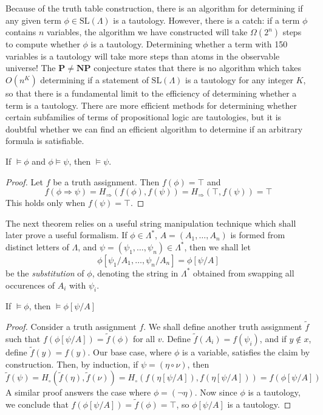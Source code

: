 Because of the truth table construction, there is an algorithm for determining if any given term $\phi \in \text{SL}(\Lambda)$ is a tautology. However, there is a catch: if a term $\phi$ contains $n$ variables, the algorithm we have constructed will take $\Omega(2^n)$ steps to compute whether $\phi$ is a tautology. Determining whether a term with 150 variables is a tautology will take more steps than atoms in the observable universe! The $\mathbf{P} \neq \mathbf{NP}$ conjecture states that there is no algorithm which takes $O(n^K)$ determining if a statement of $\text{SL}(\Lambda)$ is a tautology for any integer $K$, so that there is a fundamental limit to the efficiency of determining whether a term is a tautology. There are more efficient methods for determining whether certain subfamilies of terms of propositional logic are tautologies, but it is doubtful whether we can find an efficient algorithm to determine if an arbitrary formula is satisfiable.

\begin{theorem}
    If $\vDash \phi$ and $\phi \vDash \psi$, then $\vDash \psi$.
\end{theorem}
\begin{proof}
    Let $f$ be a truth assignment. Then $f(\phi) = \top$ and
    \[ f(\phi \Rightarrow \psi) = H_\Rightarrow(f(\phi),f(\psi)) = H_\Rightarrow(\top, f(\psi)) = \top \]
    This holds only when $f(\psi) = \top$.
\end{proof}

The next theorem relies on a useful string manipulation technique which shall later prove a useful formalism. If $\phi \in \Lambda^*$, $A = (A_1,\dots,A_n)$ is formed from distinct letters of $\Lambda$, and $\psi = (\psi_1, \dots, \psi_n) \in \Lambda^*$, then we shall let
%
\[ \phi[\psi_1/A_1, \dots, \psi_n/A_n] = \phi[\psi/A] \]
%
be the \emph{substitution} of $\phi$, denoting the string in $\Lambda^*$ obtained from swapping all occurences of $A_i$ with $\psi_i$.

\begin{theorem}
    If $\vDash \phi$, then $\vDash \phi[\psi/A]$
\end{theorem}
\begin{proof}
    Consider a truth assignment $f$. We shall define another truth assignment $\tilde{f}$ such that $f(\phi[\psi/A]) = \tilde{f}(\phi)$ for all $v$. Define $\tilde{f}(A_i) = f(\psi_i)$, and if $y \not \in x$, define $\tilde{f}(y) = f(y)$. Our base case, where $\phi$ is a variable, satisfies the claim by construction. Then, by induction, if $\psi = (\eta \circ \nu)$, then
    \[ \tilde{f}(\psi) = H_\circ(\tilde{f}(\eta), \tilde{f}(\nu)) = H_\circ(f(\eta[\psi/A]), f(\eta[\psi/A])) = f(\phi[\psi/A]) \]
    A similar proof answers the case where $\phi = (\neg \eta)$. Now since $\phi$ is a tautology, we conclude that $f(\phi[\psi/A]) = \tilde{f}(\phi) = \top$, so $\phi[\psi/A]$ is a tautology.
\end{proof}

